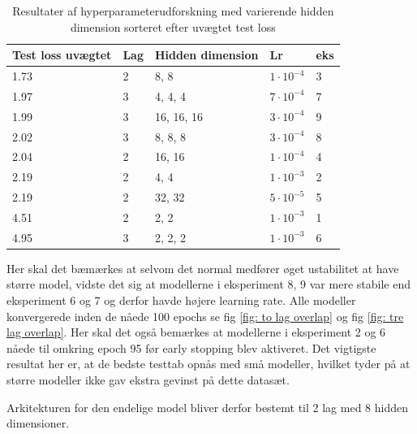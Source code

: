\begin{table}
    \centering
    \begin{tabular}{|l|l|l|l|l|}
        \hline
        \textbf{Test loss uvægtet} & \textbf{Lag} & \textbf{Hidden dimension} & \textbf{Lr} & \textbf{eks} \\ \hline
        1.73 & 2 & 8, 8 & $1\cdot10^{-4}$ & 3\\ \hline
        1.97 & 3 & 4, 4, 4 & $7\cdot10^{-4}$ & 7\\ \hline
        1.99 & 3 & 16, 16, 16 & $3\cdot10^{-4}$ & 9\\ \hline
        2.02 & 3 & 8, 8, 8 & $3\cdot10^{-4}$ & 8\\ \hline
        2.04 & 2 & 16, 16 & $1\cdot10^{-4}$ & 4\\ \hline
        2.19 & 2 & 4, 4 & $1\cdot10^{-3}$ & 2\\ \hline
        2.19 & 2 & 32, 32 & $5\cdot10^{-5}$ & 5\\ \hline
        4.51 & 2 & 2, 2 & $1\cdot10^{-3}$ & 1\\ \hline
        4.95 & 3 & 2, 2, 2 & $1\cdot10^{-3}$ & 6\\ \hline
    \end{tabular}
    \caption{Resultater af hyperparameterudforskning med varierende hidden dimension sorteret efter uvægtet test loss}
    \label{table:hyperparameter_resultater}
\end{table}

Her skal det bæmærkes at selvom det normal medfører øget ustabilitet at have større model, vidste det sig at modellerne i eksperiment 8, 9 var mere stabile end eksperiment 6 og 7
og derfor havde højere learning rate. Alle modeller konvergerede inden de nåede 100 epochs se fig \ref{fig: to lag overlap} og fig \ref{fig: tre lag overlap}. 
Her skal det også bemærkes at modellerne i eksperiment 2 og 6 nåede til omkring epoch 95 før early stopping blev aktiveret.
Det vigtigste resultat her er, at de bedste testtab opnås med små modeller, hvilket tyder på at større modeller ikke gav ekstra gevinst på dette datasæt.

Arkitekturen for den endelige model bliver derfor bestemt til 2 lag med 8 hidden dimensioner.






